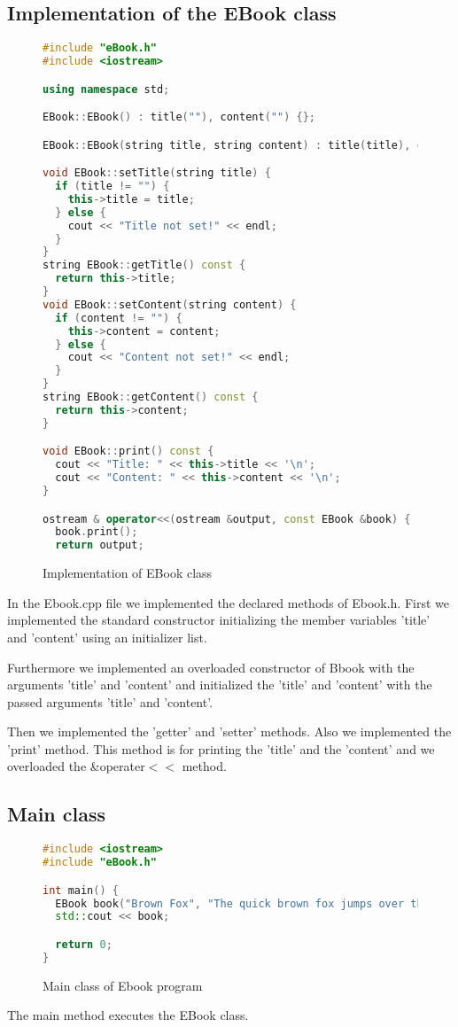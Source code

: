 \documentclass[a4paper, 10pt]{article}
\begin{document}
\subsection{Implementation of the EBook class}
\begin{figure}[H]
\begin{lstlisting}[language=c++]
#include "eBook.h"
#include <iostream>

using namespace std;

EBook::EBook() : title(""), content("") {};

EBook::EBook(string title, string content) : title(title), content(content) {};

void EBook::setTitle(string title) {
  if (title != "") {
    this->title = title;
  } else {
    cout << "Title not set!" << endl;
  }
}
string EBook::getTitle() const {
  return this->title;
}
void EBook::setContent(string content) {
  if (content != "") {
    this->content = content;
  } else {
    cout << "Content not set!" << endl;
  }
}
string EBook::getContent() const {
  return this->content;
}

void EBook::print() const {
  cout << "Title: " << this->title << '\n';
  cout << "Content: " << this->content << '\n';
}

ostream & operator<<(ostream &output, const EBook &book) {
  book.print();
  return output;
\end{lstlisting}
\caption{Implementation of EBook class}
\end{figure}
In the Ebook.cpp file we implemented the declared methods of Ebook.h.
First we implemented the standard constructor initializing the member variables 'title' and 'content' using an initializer list.

Furthermore we implemented an overloaded constructor of Bbook with the arguments 'title' and 'content' and initialized the 'title' and 'content' with the passed arguments 'title' and 'content'.

Then we implemented the 'getter' and 'setter' methods.
Also we implemented the 'print' method. This method is for printing the 'title' and the 'content' and we overloaded the \&operater$<<$ method.

\subsection{Main class}
\begin{figure}[H]
\begin{lstlisting}[language=c++]
#include <iostream>
#include "eBook.h"

int main() {
  EBook book("Brown Fox", "The quick brown fox jumps over the lazy dog.");
  std::cout << book;

  return 0;
}
\end{lstlisting}
\caption{Main class of Ebook program}
\end{figure}
The main method executes the EBook class.
\end{document}
